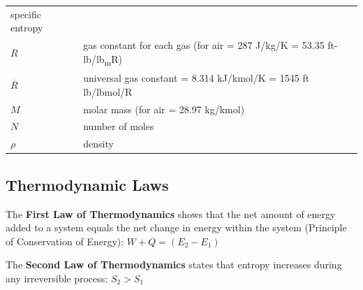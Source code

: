\documentclass[
]{book}
\begin{document}
\begin{longtable}[]{@{}ll@{}}
\begin{minipage}[t]{0.36\columnwidth}
specific entropy\strut
\end{minipage}\tabularnewline
\begin{minipage}[t]{0.58\columnwidth}\raggedright
\(R\)\strut
\end{minipage} & \begin{minipage}[t]{0.36\columnwidth}\raggedright
gas constant for each gas (for air = 287 J/kg/K = 53.35 ft-lb/lb\textsubscript{m}R)\strut
\end{minipage}\tabularnewline
\begin{minipage}[t]{0.58\columnwidth}\raggedright
\(\overline{R}\)\strut
\end{minipage} & \begin{minipage}[t]{0.36\columnwidth}\raggedright
universal gas constant = 8.314 kJ/kmol/K = 1545 ft lb/lbmol/R\strut
\end{minipage}\tabularnewline
\begin{minipage}[t]{0.58\columnwidth}\raggedright
\(M\)\strut
\end{minipage} & \begin{minipage}[t]{0.36\columnwidth}\raggedright
molar mass (for air = 28.97 kg/kmol)\strut
\end{minipage}\tabularnewline
\begin{minipage}[t]{0.58\columnwidth}\raggedright
\(N\)\strut
\end{minipage} & \begin{minipage}[t]{0.36\columnwidth}\raggedright
number of moles\strut
\end{minipage}\tabularnewline
\begin{minipage}[t]{0.58\columnwidth}\raggedright
\(\rho\)\strut
\end{minipage} & \begin{minipage}[t]{0.36\columnwidth}\raggedright
density\strut
\end{minipage}\tabularnewline
\bottomrule
\end{longtable}

\hypertarget{thermodynamic-laws}{%
\subsection{Thermodynamic Laws}\label{thermodynamic-laws}}

The \textbf{First Law of Thermodynamics} shows that the net amount of energy added to a system equals the net change in energy within the system (Principle of Conservation of Energy): \(W + Q = (E_2 - E_1)\)

The \textbf{Second Law of Thermodynamics} states that entropy increases during any irreversible process: \(S_2 > S_1\)
\end{document}
